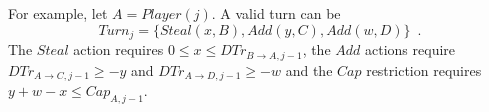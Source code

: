 For example, let $A = Player(j)$. A valid turn can be
\begin{equation*}
  Turn_j = \{Steal\left(x, B\right), Add\left(y, C\right), Add\left(w, D\right)\} \enspace.
\end{equation*}
The $Steal$ action requires $0 \leq x \leq DTr_{B \rightarrow A, j-1}$, the $Add$ actions require
$DTr_{A \rightarrow C, j-1} \geq -y$ and $DTr_{A \rightarrow D, j-1} \geq -w$ and the $Cap$ restriction requires
$y + w - x \leq Cap_{A, j-1}$.

